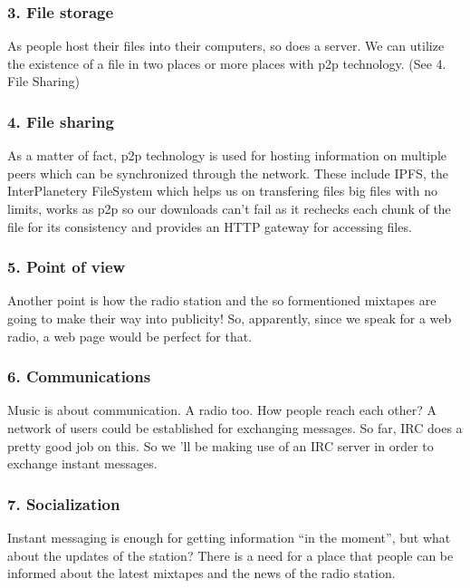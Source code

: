 \documentclass[12pt]{report}
\begin{document}
\subsubsection{3. File storage}\label{file-storage}

As people host their files into their computers, so does a server. We
can utilize the existence of a file in two places or more places with
p2p technology. (See 4. File Sharing)


\subsubsection{4. File sharing}\label{file-sharing}

As a matter of fact, p2p technology is used for hosting information on
multiple peers which can be synchronized through the network. These
include IPFS, the InterPlanetery FileSystem which helps us on
transfering files big files with no limits, works as p2p so our
downloads can't fail as it rechecks each chunk of the file for its
consistency and provides an HTTP gateway for accessing files.


\subsubsection{5. Point of view}\label{point-of-view}

Another point is how the radio station and the so formentioned mixtapes
are going to make their way into publicity! So, apparently, since we
speak for a web radio, a web page would be perfect for that.


\subsubsection{6. Communications}\label{communications}

Music is about communication. A radio too. How people reach each other?
A network of users could be established for exchanging messages. So far,
IRC does a pretty good job on this. So we 'll be making use of an IRC
server in order to exchange instant messages.


\subsubsection{7. Socialization}\label{socialization}

Instant messaging is enough for getting information ``in the moment'',
but what about the updates of the station? There is a need for a place
that people can be informed about the latest mixtapes and the news of
the radio station.
\end{document}

